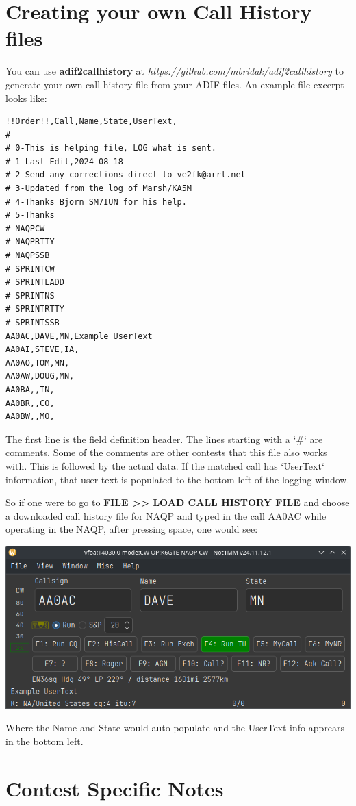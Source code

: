 \documentclass{article}
\begin{document}
\section{Creating your own Call History files}
You can use \textbf{adif2callhistory} at 
\emph{https://github.com/mbridak/adif2callhistory} to generate your own call history file from your ADIF files.
An example file excerpt looks like:

\begin{verbatim}
!!Order!!,Call,Name,State,UserText,
#
# 0-This is helping file, LOG what is sent.
# 1-Last Edit,2024-08-18
# 2-Send any corrections direct to ve2fk@arrl.net
# 3-Updated from the log of Marsh/KA5M
# 4-Thanks Bjorn SM7IUN for his help.
# 5-Thanks
# NAQPCW
# NAQPRTTY
# NAQPSSB
# SPRINTCW
# SPRINTLADD
# SPRINTNS
# SPRINTRTTY
# SPRINTSSB
AA0AC,DAVE,MN,Example UserText
AA0AI,STEVE,IA,
AA0AO,TOM,MN,
AA0AW,DOUG,MN,
AA0BA,,TN,
AA0BR,,CO,
AA0BW,,MO,
\end{verbatim}
\newpage
The first line is the field definition header. The lines starting with a `\#` are comments. Some of the comments are other contests that this file also works with.
This is followed by the actual data. If the matched call has `UserText` information, that user text is populated to the bottom left of the logging window.

So if one were to go to \textbf{FILE >> LOAD CALL HISTORY FILE} and choose a downloaded call history file for NAQP and typed in the call AA0AC while operating in the NAQP, after pressing space, one would see:

\vspace{0.5cm}
\includegraphics[width=0.9\linewidth]{pic/call_history_example.png}
\vspace{0.5cm}

Where the Name and State would auto-populate and the UserText info apprears in the bottom left.
\newpage
\section{Contest Specific Notes}
\end{document}
